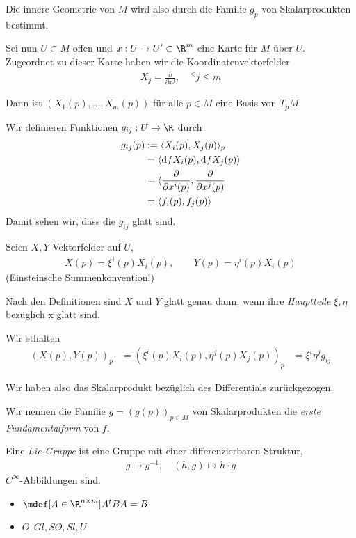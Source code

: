 Die innere Geometrie von $M$ wird also durch die Familie $g_p$ von
Skalarprodukten bestimmt.


Sei nun $U\subset M$ offen und $x : U \to U' \subset \R^m$ eine Karte für $M$
über $U$. Zugeordnet zu dieser Karte haben wir die Koordinatenvektorfelder
\begin{align}
  X_j = \frac{\partial}{\partial x^j}, \quad ^\leq j \leq m
\end{align}

Dann ist $(X_1(p), \dots, X_m(p))$ für alle $p\in M$ eine Basis von $T_p M$.

Wir definieren Funktionen $g_{ij} : U\to \R$ durch
\begin{align}
  g_{ij}(p) &:= \langle X_i(p), X_j(p)\rangle_p \\
            &= \langle \mathrm d f X_i(p), \mathrm d f X_j(p)\rangle \\
            &= \langle \frac{\partial}{\partial x^i(p)},
            \frac{\partial}{\partial x^j(p)} \\
            &= \langle f_i(p), f_j(p) \rangle
\end{align}
Damit sehen wir, dass die $g_{ij}$ glatt sind.

Seien $X,Y$ Vektorfelder auf $U$,
\begin{align}
  X(p) = \xi^i(p)X_i(p), \qquad Y(p) = \eta^i(p)X_i(p)
\end{align} (Einsteinsche Summenkonvention!)

Nach den Definitionen sind $X$ und $Y$ glatt genau dann, wenn ihre
\emph{Hauptteile} $\xi, \eta$ bezüglich x glatt sind.

Wir ethalten
\begin{align}
  (X(p), Y(p))_p &= (\xi^i(p)X_i(p), \eta^j(p)X_j(p))_p
  &= \xi^i\eta^jg_{ij}
\end{align}

Wir haben also das Skalarprodukt bezüglich des Differentials zurückgezogen.

Wir nennen die Familie $g = (g(p))_{p\in M}$ von Skalarprodukten die \emph{erste
Fundamentalform} von $f$.


\begin{dfn}
  Eine \emph{Lie-Gruppe} ist eine Gruppe mit einer differenzierbaren Struktur,
  \begin{align}
    g\mapsto g^{-1}, \quad (h,g)\mapsto h\cdot g
  \end{align}
  $C^\infty$-Abbildungen sind.

  \begin{bsps}
    \begin{itemize}
      \item $\mdef[A\in \R^{n\times m}]{A^tBA=B}$
      \item $O, Gl, SO, Sl, U$
    \end{itemize}
  \end{bsps}
\end{dfn}


